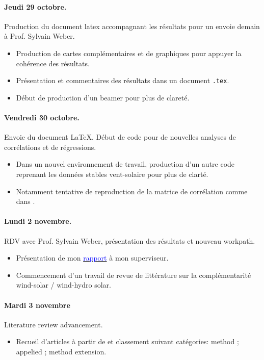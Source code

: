 \documentclass[11pt, a4paper]{article}
\begin{document}
\paragraph{Jeudi 29 octobre.} Production du document latex accompagnant les résultats pour un envoie demain à Prof. Sylvain Weber. 
\begin{itemize}
    \item Production de cartes complémentaires et de graphiques pour appuyer la cohérence des résultats.
    \item Présentation et commentaires des résultats dans un document \texttt{.tex}.
    \item Début de production d'un beamer pour plus de clareté. 
\end{itemize}

\paragraph{Vendredi 30 octobre.} Envoie du document LaTeX. Début de code pour de nouvelles analyses de corrélations et de régressions.
\begin{itemize}
    \item Dans un nouvel environnement de travail, production d'un autre code reprenant les données stables vent-solaire pour plus de clarté. 
    \item Notamment tentative de reproduction de la matrice de corrélation comme dans \citet[Figure 1]{cauz2025embracing}.
\end{itemize}

\paragraph{Lundi 2 novembre.} RDV avec Prof. Sylvain Weber, présentation des résultats et nouveau workpath.
\begin{itemize}
    \item Présentation de mon \href{https://github.com/LeLubb/Predoc-HEG/tree/main/Reports/Report_descriptive_data_wind_solar}{\textcolor{blue}{rapport}} à mon superviseur.
    \item Commencement d'un travail de revue de littérature sur la complémentarité wind-solar / wind-hydro solar.
\end{itemize}

\paragraph{Mardi 3 novembre} Literature review advancement.
\begin{itemize}
    \item Recueil d'articles à partir de \citep{canalesAssessingTemporalComplementarity2020} et classement suivant catégories: method ; appelied ; method extension.
\end{itemize}
\end{document}
